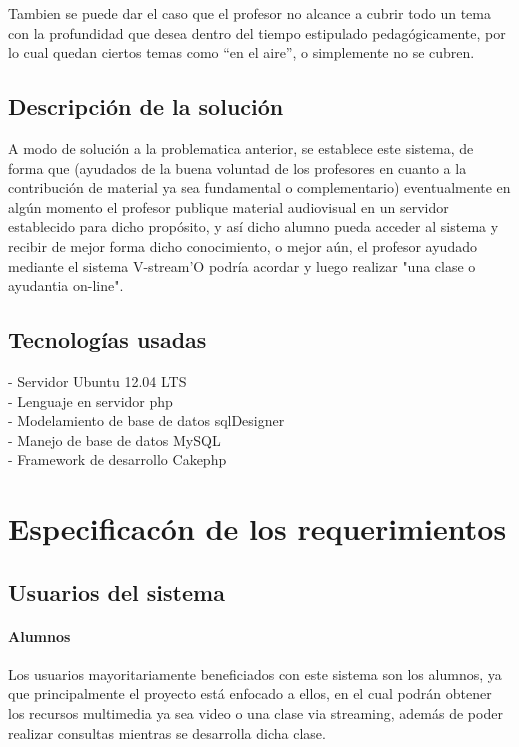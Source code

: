 \documentclass[12pt]{article}
\begin{document}
Tambien se puede dar el caso que el profesor no alcance a cubrir todo un tema con la profundidad que desea
dentro del tiempo estipulado pedagógicamente, por lo cual quedan ciertos temas como ``en el aire'', o
simplemente no se cubren.


\subsection{Descripción de la solución}
A modo de solución a la problematica anterior, se establece este sistema, de forma que (ayudados de la buena
voluntad de los profesores en cuanto a la contribución de material ya sea fundamental o complementario) 
eventualmente en algún momento el profesor publique material 
audiovisual en un servidor establecido para dicho propósito, y así dicho alumno pueda acceder al sistema 
y recibir de mejor forma dicho conocimiento, o mejor aún, el profesor ayudado mediante el sistema V-stream'O podría
acordar y luego realizar "una clase o ayudantia on-line".

\subsection{Tecnologías usadas}

- Servidor Ubuntu 12.04 LTS\\

- Lenguaje en servidor php\\

- Modelamiento de base de datos sqlDesigner\\

- Manejo de base de datos MySQL\\

- Framework de desarrollo Cakephp\\ 


\newpage
\section{Especificacón de los requerimientos}
\subsection{Usuarios del sistema}
\paragraph{Alumnos\\}

Los usuarios mayoritariamente beneficiados con este sistema son los alumnos, ya que principalmente
el proyecto está enfocado a ellos, en el cual podrán obtener los recursos multimedia ya sea video
o una clase via streaming, además de poder realizar consultas mientras se desarrolla dicha clase.
\end{document}
